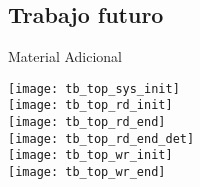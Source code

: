 \documentclass[11pt,a4paper]{beamer}
\begin{document}
		\subsection{Trabajo futuro}
						
			\begin{frame}{Material Adicional}
			\end{frame}
			\tiny{
			
			
			
				
			\texttt{[image: tb\_top\_sys\_init]}\\
			\texttt{[image: tb\_top\_rd\_init]}\\
			\texttt{[image: tb\_top\_rd\_end]}\\
			\texttt{[image: tb\_top\_rd\_end\_det]}\\
			\texttt{[image: tb\_top\_wr\_init]}\\
			\texttt{[image: tb\_top\_wr\_end]}\\
			
			
			
			}
\end{document}
